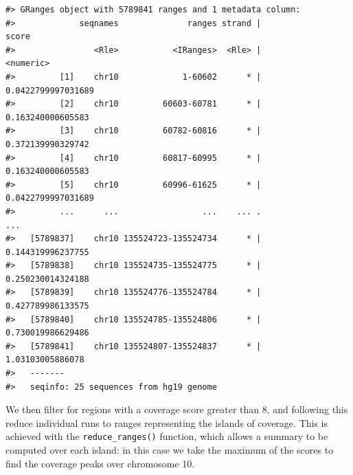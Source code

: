 \documentclass[]{article}
\newenvironment{Shaded}{\begin{snugshade}}{\end{snugshade}}
\newcommand{\DataTypeTok}[1]{\textcolor[rgb]{0.13,0.29,0.53}{#1}}
\newcommand{\DecValTok}[1]{\textcolor[rgb]{0.00,0.00,0.81}{#1}}
\newcommand{\KeywordTok}[1]{\textcolor[rgb]{0.13,0.29,0.53}{\textbf{#1}}}
\newcommand{\NormalTok}[1]{#1}
\newcommand{\OperatorTok}[1]{\textcolor[rgb]{0.81,0.36,0.00}{\textbf{#1}}}
\newcommand{\StringTok}[1]{\textcolor[rgb]{0.31,0.60,0.02}{#1}}
\begin{document}
\begin{Shaded}
\end{Shaded}

\begin{verbatim}
#> GRanges object with 5789841 ranges and 1 metadata column:
#>             seqnames              ranges strand |              score
#>                <Rle>           <IRanges>  <Rle> |          <numeric>
#>         [1]    chr10             1-60602      * | 0.0422799997031689
#>         [2]    chr10         60603-60781      * |  0.163240000605583
#>         [3]    chr10         60782-60816      * |  0.372139990329742
#>         [4]    chr10         60817-60995      * |  0.163240000605583
#>         [5]    chr10         60996-61625      * | 0.0422799997031689
#>         ...      ...                 ...    ... .                ...
#>   [5789837]    chr10 135524723-135524734      * |  0.144319996237755
#>   [5789838]    chr10 135524735-135524775      * |  0.250230014324188
#>   [5789839]    chr10 135524776-135524784      * |  0.427789986133575
#>   [5789840]    chr10 135524785-135524806      * |  0.730019986629486
#>   [5789841]    chr10 135524807-135524837      * |   1.03103005886078
#>   -------
#>   seqinfo: 25 sequences from hg19 genome
\end{verbatim}

We then filter for regions with a coverage score greater than 8, and
following this reduce individual runs to ranges representing the islands
of coverage. This is achieved with the \texttt{reduce\_ranges()}
function, which allows a summary to be computed over each island: in
this case we take the maximum of the scores to find the coverage peaks
over chromosome 10.

\begin{Shaded}
\end{Shaded}
\end{document}
